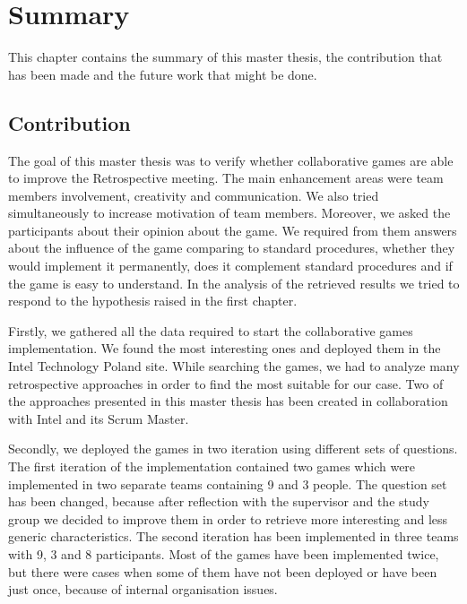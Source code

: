 \chapter{Summary}
This chapter contains the summary of this master thesis, the contribution that has been made and the future work that might be done.

\section{Contribution}

The goal of this master thesis was to verify whether collaborative games are able to improve the Retrospective meeting. The main enhancement areas were team members involvement, creativity and communication. We also tried simultaneously to increase motivation of team members. Moreover, we asked the participants about their opinion about the game. We required from them answers about the influence of the game comparing to standard procedures, whether they would implement it permanently, does it complement standard procedures and if the game is easy to understand. In the analysis of the retrieved results we tried to respond to the hypothesis raised in the first chapter.

Firstly, we gathered all the data required to start the collaborative games implementation. We found the most interesting ones and deployed them in the Intel Technology Poland site. While searching the games, we had to analyze many retrospective approaches in order to find the most suitable for our case. Two of the approaches presented in this master thesis has been created in collaboration with Intel and its Scrum Master.

Secondly, we deployed the games in two iteration using different sets of questions. The first iteration of the implementation contained two games which were implemented in two separate teams containing 9 and 3 people. The question set has been changed, because after reflection with the supervisor and the study group we decided to improve them in order to retrieve more interesting and less generic characteristics. The second iteration has been implemented in three teams with 9, 3 and 8 participants. Most of the games have been implemented twice, but there were cases when some of them have not been deployed or have been just once, because of internal organisation issues.

